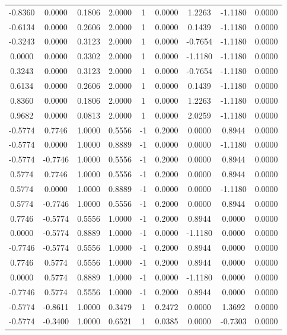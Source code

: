 \documentclass[11pt]{article}
\begin{document}
\begin{longtable}{c c|c c|c|c|c c|c}
-0.8360 & 0.0000 & 0.1806 & 2.0000 & 1 & 0.0000 & 1.2263 & -1.1180 & 0.0000 \\
-0.6134 & 0.0000 & 0.2606 & 2.0000 & 1 & 0.0000 & 0.1439 & -1.1180 & 0.0000 \\
-0.3243 & 0.0000 & 0.3123 & 2.0000 & 1 & 0.0000 & -0.7654 & -1.1180 & 0.0000 \\
0.0000 & 0.0000 & 0.3302 & 2.0000 & 1 & 0.0000 & -1.1180 & -1.1180 & 0.0000 \\
0.3243 & 0.0000 & 0.3123 & 2.0000 & 1 & 0.0000 & -0.7654 & -1.1180 & 0.0000 \\
0.6134 & 0.0000 & 0.2606 & 2.0000 & 1 & 0.0000 & 0.1439 & -1.1180 & 0.0000 \\
0.8360 & 0.0000 & 0.1806 & 2.0000 & 1 & 0.0000 & 1.2263 & -1.1180 & 0.0000 \\
0.9682 & 0.0000 & 0.0813 & 2.0000 & 1 & 0.0000 & 2.0259 & -1.1180 & 0.0000 \\
-0.5774 & 0.7746 & 1.0000 & 0.5556 & -1 & 0.2000 & 0.0000 & 0.8944 & 0.0000 \\
-0.5774 & 0.0000 & 1.0000 & 0.8889 & -1 & 0.0000 & 0.0000 & -1.1180 & 0.0000 \\
-0.5774 & -0.7746 & 1.0000 & 0.5556 & -1 & 0.2000 & 0.0000 & 0.8944 & 0.0000 \\
0.5774 & 0.7746 & 1.0000 & 0.5556 & -1 & 0.2000 & 0.0000 & 0.8944 & 0.0000 \\
0.5774 & 0.0000 & 1.0000 & 0.8889 & -1 & 0.0000 & 0.0000 & -1.1180 & 0.0000 \\
0.5774 & -0.7746 & 1.0000 & 0.5556 & -1 & 0.2000 & 0.0000 & 0.8944 & 0.0000 \\
0.7746 & -0.5774 & 0.5556 & 1.0000 & -1 & 0.2000 & 0.8944 & 0.0000 & 0.0000 \\
0.0000 & -0.5774 & 0.8889 & 1.0000 & -1 & 0.0000 & -1.1180 & 0.0000 & 0.0000 \\
-0.7746 & -0.5774 & 0.5556 & 1.0000 & -1 & 0.2000 & 0.8944 & 0.0000 & 0.0000 \\
0.7746 & 0.5774 & 0.5556 & 1.0000 & -1 & 0.2000 & 0.8944 & 0.0000 & 0.0000 \\
0.0000 & 0.5774 & 0.8889 & 1.0000 & -1 & 0.0000 & -1.1180 & 0.0000 & 0.0000 \\
-0.7746 & 0.5774 & 0.5556 & 1.0000 & -1 & 0.2000 & 0.8944 & 0.0000 & 0.0000 \\
-0.5774 & -0.8611 & 1.0000 & 0.3479 & 1 & 0.2472 & 0.0000 & 1.3692 & 0.0000 \\
-0.5774 & -0.3400 & 1.0000 & 0.6521 & 1 & 0.0385 & 0.0000 & -0.7303 & 0.0000 \\

\end{longtable}
\end{document}

